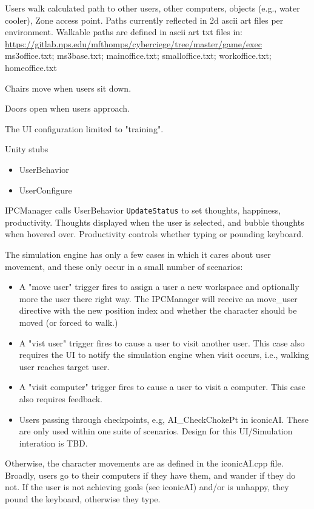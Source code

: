 \documentclass{article}
\begin{document}
Users walk calculated path to other users, other computers,
objects (e.g., water cooler), Zone access point.  Paths currently
reflected in 2d ascii art files per environment.
Walkable paths are defined in ascii art txt files in: \newline
\url{https://gitlab.nps.edu/mfthomps/cyberciege/tree/master/game/exec}
ms3office.txt; ms3base.txt; mainoffice.txt; smalloffice.txt; workoffice.txt; homeoffice.txt

Chairs move when users sit down.

Doors open when users approach.

The UI configuration limited to "training".

\noindent Unity stubs 
\begin{itemize}
\item UserBehavior
\item UserConfigure
\end{itemize}

IPCManager calls UserBehavior {\tt UpdateStatus} to set thoughts, happiness, productivity.  
Thoughts displayed when the user is selected, and bubble thoughts when hovered over.
Productivity controls whether typing or pounding keyboard.

The simulation engine has only a few cases in which it cares about user movement, and these
only occur in a small number of scenarios:
\begin{itemize}
	\item A "move user" trigger fires to assign a user a new workspace and optionally more the user
		there right way.  The IPCManager will receive aa move\_user directive with the new position index
and whether the character should be moved (or forced to walk.)
	\item A "vist user" trigger fires to cause a user to visit another user.  This case also requires
		the UI to notify the simulation engine when visit occurs, i.e., walking user reaches target user.
	\item A "visit computer" trigger fires to cause a user to visit a computer.  This case also requires feedback.
	\item Users passing through checkpoints, e.g, AI\_CheckChokePt in iconicAI.  These are only used
		within one suite of scenarios.  Design for this UI/Simulation interation is TBD.
\end{itemize}
Otherwise, the character movements are as defined in the iconicAI.cpp file.  Broadly, users go to their computers
if they have them, and wander if they do not.  If the user is not achieving goals (see iconicAI) and/or is unhappy,
they pound the keyboard, otherwise they type.
\end{document}
